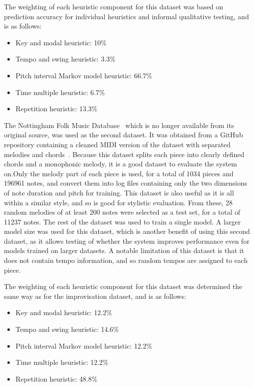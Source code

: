 The weighting of each heuristic component for this dataset was based on prediction accuracy for individual heuristics and informal qualitative testing, and is as follows:
\begin{itemize}
    \item Key and modal heuristic: 10\%
    \item Tempo and swing heuristic: 3.3\%
    \item Pitch interval Markov model heuristic: 66.7\%
    \item Time multiple heuristic: 6.7\%
    \item Repetition heuristic: 13.3\%
\end{itemize}

The Nottingham Folk Music Database~\citep{FoxleyNottingham} which is no longer available from its original source, was used as the second dataset. It was obtained from a GitHub repository containing a cleaned MIDI version of the dataset with separated melodies and chords~\citep{Jukedeck2017NottinghamGithub}. Because this dataset splits each piece into clearly defined chords and a monophonic melody, it is a good dataset to evaluate the system on.Only the melody part of each piece is used, for a total of 1034 pieces and 196961 notes, and convert them into log files containing only the two dimensions of note duration and pitch for training. This dataset is also useful as it is all within a similar style, and so is good for stylistic evaluation. From these, 28 random melodies of at least 200 notes were selected as a test set, for a total of 11237 notes. The rest of the dataset was used to train a single model. A larger model size was used for this dataset, which is another benefit of using this second dataset, as it allows testing of whether the system improves performance even for models trained on larger datasets. A notable limitation of this dataset is that it does not contain tempo information, and so random tempos are assigned to each piece.

The weighting of each heuristic component for this dataset was determined the same way as for the improvisation dataset, and is as follows:
\begin{itemize}
    \item Key and modal heuristic: 12.2\%
    \item Tempo and swing heuristic: 14.6\%
    \item Pitch interval Markov model heuristic: 12.2\%
    \item Time multiple heuristic: 12.2\%
    \item Repetition heuristic: 48.8\%
\end{itemize}

